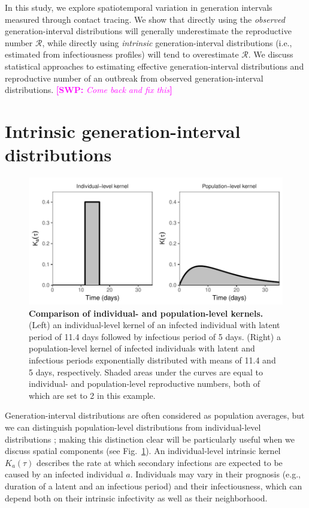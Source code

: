 \documentclass[12pt]{article}
\newcommand{\fref}[1]{Fig.~\ref{fig:#1}}
\newcommand{\RR}{\ensuremath{{\mathcal R}}}
\newcommand{\comment}[3]{\textcolor{#1}{\textbf{[#2: }\textsl{#3}\textbf{]}}}
\newcommand{\swp}[1]{\comment{magenta}{SWP}{#1}}
\begin{document}
In this study, we explore spatiotemporal variation in generation intervals measured through contact tracing.
We show that directly using the \emph{observed} generation-interval distributions will generally underestimate the reproductive number \RR, while directly using \emph{intrinsic} generation-interval distributions (i.e., estimated from infectiousness profiles) will tend to overestimate \RR.
We discuss statistical approaches to estimating effective generation-interval distributions and reproductive number of an outbreak from observed generation-interval distributions.
\swp{Come back and fix this}

\section{Intrinsic generation-interval distributions}

\begin{figure}[t]
\includegraphics[width=\textwidth]{../fig/individual_and_population.pdf}
\caption{\textbf{Comparison of individual- and population-level kernels.}
(Left) an individual-level kernel of an infected individual with latent period of 11.4 days followed by infectious period of 5 days. 
(Right) a population-level kernel of infected individuals with latent and infectious periods exponentially distributed with means of 11.4 and 5 days, respectively. 
Shaded areas under the curves are equal to individual- and population-level reproductive numbers, both of which are set to 2 in this example.
}
\label{fig:indpop}

\end{figure}

Generation-interval distributions are often considered as population averages, but we can distinguish population-level distributions from individual-level distributions \citep{svensson2007note, svensson2015influence}; 
making this distinction clear will be particularly useful when we discuss spatial components (see \fref{indpop}).
An individual-level intrinsic kernel $K_a(\tau)$ describes the rate at which secondary infections are expected to be caused by an infected individual $a$.
Individuals may vary in their prognosis (e.g., duration of a latent and an infectious period) and their infectiousness, which can depend both on their intrinsic infectivity as well as their neighborhood.
\end{document}
